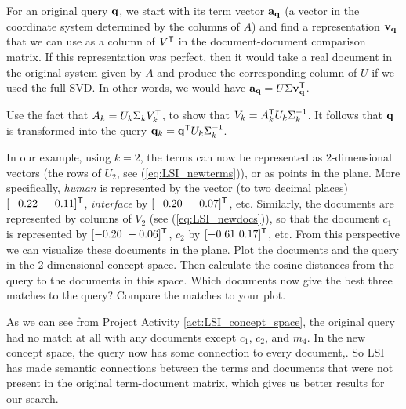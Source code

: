 \begin{pactivity} \label{act:LSI_concept_space} For an original query $\mathbf{q}$, we start with its term vector $\mathbf{a}_{\mathbf{q}}$ (a vector in the coordinate system determined by the columns of $A$) and find a representation $\mathbf{v}_{\mathbf{q}}$ that we can use as a column of $V^{\mathsf{T}}$ in the document-document comparison matrix. If this representation was perfect, then it would take a real document in the original system given by $A$ and produce the corresponding column of $U$ if we used the full SVD. In other words, we would have $\mathbf{a}_{\mathbf{q}} = U \Sigma \mathbf{v}_{\mathbf{q}}^{\mathsf{T}}$. 
\ba
\item Use the fact that $A_k = U_k \Sigma_k V_k^{\mathsf{T}}$, to show that $V_k = A_k^{\mathsf{T}} U_k \Sigma_k^{-1}$. It follows that $\mathbf{q}$ is transformed into the query $\mathbf{q}_k = \mathbf{q}^{\mathsf{T}}U_k \Sigma_k^{-1}$.

\item In our example, using $k=2$, the terms can now be represented as $2$-dimensional vectors (the rows of $U_2$, see (\ref{eq:LSI_newterms})), or as points in the plane. More specifically, \emph{human} is represented by the vector (to two decimal places) $[-0.22 \ -0.11]^{\tr}$, \emph{interface} by $[- 0.20 \ - 0.07]^{\mathsf{T}}$,  etc. Similarly, the documents are represented by columns of $V_2$ (see  (\ref{eq:LSI_newdocs})), so that the document $c_1$ is represented by $[-0.20 \ -0.06]^{\tr}$, $c_2$ by $[-0.61 \ 0.17]^{\mathsf{T}}$, etc. From this perspective we can visualize these documents in the plane. Plot the documents and the query in the 2-dimensional concept space. Then calculate the cosine distances from the query to the documents in this space. Which documents now give the best three matches to the query? Compare the matches to your plot. 


\ea

\end{pactivity}

As we can see from Project Activity \ref{act:LSI_concept_space}, the original query had no match at all with any documents except $c_1$, $c_2$, and $m_4$. In the new concept space, the query now has some connection to every document,. So LSI has made semantic connections between the terms and documents that were not present in the original term-document matrix, which gives us better results for our search. 





